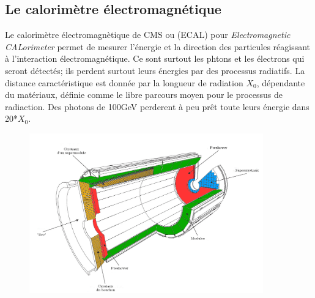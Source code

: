 \subsection{Le calorimètre électromagnétique}
Le calorimètre électromagnètique de CMS ou (ECAL) pour \textit{Electromagnetic CALorimeter} permet de mesurer l'énergie et la direction des particules réagissant à l'interaction électromagnétique. Ce sont surtout les phtons et les électrons qui seront détectés; ils perdent surtout leurs énergies par des processus radiatifs. La distance caractéristique est donnée par la longueur de radiation $X_{0}$, dépendante du matériaux, définie comme le libre parcours moyen pour le processus de radiaction. Des photons de 100GeV perderent à peu prêt toute leurs énergie dans 20*$X_{0}$.
\begin{figure}[ht!]
	\centering
	\includegraphics[width=0.90\textwidth]{CMS/ECAL.png}
	\label{ECAL}
\end{figure}

